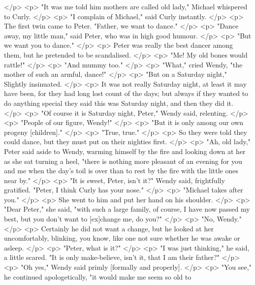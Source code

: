     </p>
    <p>
      "It was me told him mothers are called old lady," Michael whispered to
      Curly.
    </p>
    <p>
      "I complain of Michael," said Curly instantly.
    </p>
    <p>
      The first twin came to Peter. "Father, we want to dance."
    </p>
    <p>
      "Dance away, my little man," said Peter, who was in high good humour.
    </p>
    <p>
      "But we want you to dance."
    </p>
    <p>
      Peter was really the best dancer among them, but he pretended to be
      scandalised.
    </p>
    <p>
      "Me! My old bones would rattle!"
    </p>
    <p>
      "And mummy too."
    </p>
    <p>
      "What," cried Wendy, "the mother of such an armful, dance!"
    </p>
    <p>
      "But on a Saturday night," Slightly insinuated.
    </p>
    <p>
      It was not really Saturday night, at least it may have been, for they had
      long lost count of the days; but always if they wanted to do anything
      special they said this was Saturday night, and then they did it.
    </p>
    <p>
      "Of course it is Saturday night, Peter," Wendy said, relenting.
    </p>
    <p>
      "People of our figure, Wendy!"
    </p>
    <p>
      "But it is only among our own progeny [children]."
    </p>
    <p>
      "True, true."
    </p>
    <p>
      So they were told they could dance, but they must put on their nighties
      first.
    </p>
    <p>
      "Ah, old lady," Peter said aside to Wendy, warming himself by the fire and
      looking down at her as she sat turning a heel, "there is nothing more
      pleasant of an evening for you and me when the day's toil is over than to
      rest by the fire with the little ones near by."
    </p>
    <p>
      "It is sweet, Peter, isn't it?" Wendy said, frightfully gratified. "Peter,
      I think Curly has your nose."
    </p>
    <p>
      "Michael takes after you."
    </p>
    <p>
      She went to him and put her hand on his shoulder.
    </p>
    <p>
      "Dear Peter," she said, "with such a large family, of course, I have now
      passed my best, but you don't want to [ex]change me, do you?"
    </p>
    <p>
      "No, Wendy."
    </p>
    <p>
      Certainly he did not want a change, but he looked at her uncomfortably,
      blinking, you know, like one not sure whether he was awake or asleep.
    </p>
    <p>
      "Peter, what is it?"
    </p>
    <p>
      "I was just thinking," he said, a little scared. "It is only make-believe,
      isn't it, that I am their father?"
    </p>
    <p>
      "Oh yes," Wendy said primly [formally and properly].
    </p>
    <p>
      "You see," he continued apologetically, "it would make me seem so old to
